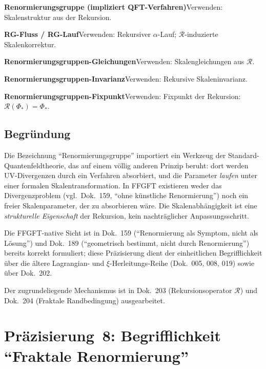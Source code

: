 \smallskip\noindent \textbf{Renormierungsgruppe (impliziert QFT-Verfahren)}\quad Verwenden: Skalenstruktur aus der Rekursion.

\smallskip\noindent \textbf{RG-Fluss / RG-Lauf}\quad Verwenden: Rekursiver $\alpha$-Lauf; $\mathcal{R}$-induzierte Skalenkorrektur.

\smallskip\noindent \textbf{Renormierungsgruppen-Gleichungen}\quad Verwenden: Skalengleichungen aus $\mathcal{R}$.

\smallskip\noindent \textbf{Renormierungsgruppen-Invarianz}\quad Verwenden: Rekursive Skaleninvarianz.

\smallskip\noindent \textbf{Renormierungsgruppen-Fixpunkt}\quad Verwenden: Fixpunkt der Rekursion: $\mathcal{R}(\Phi_*) = \Phi_*$.

\medskip


\subsection*{Begründung}

Die Bezeichnung \enquote{Renormierungsgruppe} importiert ein Werkzeug
der Standard-Quantenfeldtheorie, das auf einem völlig anderen Prinzip
beruht: dort werden UV-Divergenzen durch ein Verfahren absorbiert, und
die Parameter \emph{laufen} unter einer formalen Skalentransformation.
In FFGFT existieren weder das Divergenzproblem (vgl.\ Dok.~159,
\enquote{ohne künstliche Renormierung}) noch ein freier Skalenparameter, der
zu absorbieren wäre. Die Skalenabhängigkeit ist eine \emph{strukturelle
Eigenschaft} der Rekursion, kein nachträglicher Anpassungsschritt.

Die FFGFT-native Sicht ist in Dok.~159 (\enquote{Renormierung als Symptom,
nicht als Lösung}) und Dok.~189 (\enquote{geometrisch bestimmt, nicht durch
Renormierung}) bereits korrekt formuliert; diese Präzisierung dient der
einheitlichen Begrifflichkeit über die ältere Lagrangian- und
$\xi$-Herleitungs-Reihe (Dok.~005, 008, 019) sowie über Dok.~202.

Der zugrundeliegende Mechanismus ist in Dok.~203
(Rekursionsoperator $\mathcal{R}$) und Dok.~204
(Fraktale Randbedingung) ausgearbeitet.

\section{\texorpdfstring{Präzisierung~8: Begrifflichkeit \enquote{Fraktale Renormierung}}{Praezisierung 8: Begrifflichkeit Fraktale Renormierung}}

